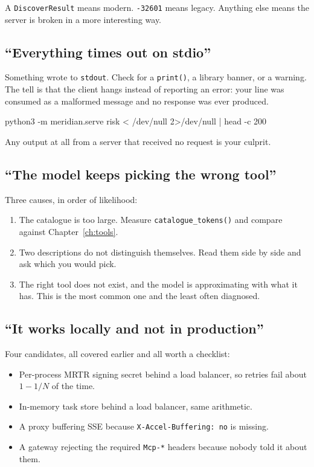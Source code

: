 A \texttt{DiscoverResult} means modern. \texttt{-32601} means legacy. Anything
else means the server is broken in a more interesting way.

\subsection{``Everything times out on stdio''}

Something wrote to \texttt{stdout}. Check for a \texttt{print()}, a library
banner, or a warning. The tell is that the client hangs instead of reporting an error: your line was
consumed as a malformed message and no response was ever produced.

\begin{sh}
python3 -m meridian.serve risk < /dev/null 2>/dev/null | head -c 200
\end{sh}

Any output at all from a server that received no request is your culprit.

\subsection{``The model keeps picking the wrong tool''}

Three causes, in order of likelihood:

\begin{enumerate}[leftmargin=1.6em, itemsep=2pt]
\item The catalogue is too large. Measure \texttt{catalogue\_tokens()} and
compare against Chapter~\ref{ch:tools}.
\item Two descriptions do not distinguish themselves. Read them side by side and
ask which you would pick.
\item The right tool does not exist, and the model is approximating with what it
has. This is the most common one and the least often diagnosed.
\end{enumerate}

\subsection{``It works locally and not in production''}

Four candidates, all covered earlier and all worth a checklist:

\begin{itemize}[leftmargin=1.6em, itemsep=2pt]
\item Per-process MRTR signing secret behind a load balancer, so retries fail
about $1 - 1/N$ of the time.
\item In-memory task store behind a load balancer, same arithmetic.
\item A proxy buffering SSE because \texttt{X-Accel-Buffering: no} is missing.
\item A gateway rejecting the required \texttt{Mcp-*} headers because nobody told
it about them.
\end{itemize}

